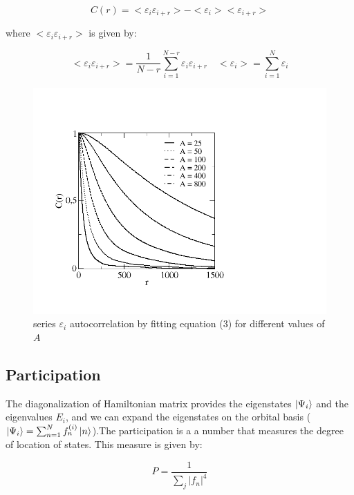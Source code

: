 \documentclass{comjnl}
\begin{document}
\begin{equation}
    C(r) = <\varepsilon_i\varepsilon_{i+r}>-<\varepsilon_i><\varepsilon_{i+r}>
\end{equation}

\noindent where $<\varepsilon_i\varepsilon_{i+r}>$ is given by:

\begin{equation*}
    <\varepsilon_i\varepsilon_{i+r}> = \frac{1}{N-r}\sum_{i=1}^{N-r}\varepsilon_i\varepsilon_{i+r} \quad
    <\varepsilon_{i}>=\sum_{i=1}^{N}\varepsilon_i
\end{equation*}

\begin{figure}[ht]
  \centering
  \includegraphics[width= \linewidth]{acr.png}
  \caption{series $\varepsilon_i$ autocorrelation by fitting equation (3) for different values of $A$}
\end{figure}

\subsection{Participation}
\noindent The diagonalization of Hamiltonian matrix provides the eigenstates $\ket{\Psi_i}$ and the eigenvalues $E_i$, and we can expand the eigenstates on the orbital basis ($\ket{\Psi_i} = \sum_{n=1}^N f_n^{(i)} \ket{n}$).The participation is a a
number that measures the degree of location of states. This measure is given by:

\begin{equation}
    \displaystyle{P = \frac{1}{\sum_j |f_n|^4}}
\end{equation}
\end{document}
